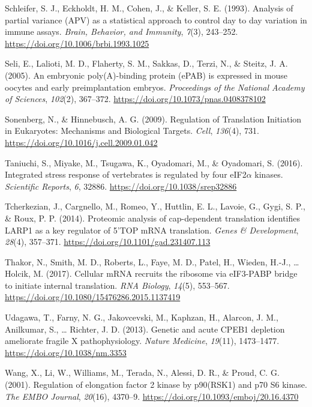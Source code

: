 \documentclass[12pt,openany]{book}
\begin{document}
\hypertarget{ref-Schleifer1993}{}
Schleifer, S. J., Eckholdt, H. M., Cohen, J., \& Keller, S. E. (1993).
Analysis of partial variance (APV) as a statistical approach to control
day to day variation in immune assays. \emph{Brain, Behavior, and
Immunity}, \emph{7}(3), 243--252.
\url{https://doi.org/10.1006/brbi.1993.1025}

\hypertarget{ref-Seli2005}{}
Seli, E., Lalioti, M. D., Flaherty, S. M., Sakkas, D., Terzi, N., \&
Steitz, J. A. (2005). An embryonic poly(A)-binding protein (ePAB) is
expressed in mouse oocytes and early preimplantation embryos.
\emph{Proceedings of the National Academy of Sciences}, \emph{102}(2),
367--372. \url{https://doi.org/10.1073/pnas.0408378102}

\hypertarget{ref-Sonenberg2009}{}
Sonenberg, N., \& Hinnebusch, A. G. (2009). Regulation of Translation
Initiation in Eukaryotes: Mechanisms and Biological Targets.
\emph{Cell}, \emph{136}(4), 731.
\url{https://doi.org/10.1016/j.cell.2009.01.042}

\hypertarget{ref-Taniuchi2016}{}
Taniuchi, S., Miyake, M., Tsugawa, K., Oyadomari, M., \& Oyadomari, S.
(2016). Integrated stress response of vertebrates is regulated by four
eIF2\(\alpha\) kinases. \emph{Scientific Reports}, \emph{6}, 32886.
\url{https://doi.org/10.1038/srep32886}

\hypertarget{ref-Tcherkezian2014}{}
Tcherkezian, J., Cargnello, M., Romeo, Y., Huttlin, E. L., Lavoie, G.,
Gygi, S. P., \& Roux, P. P. (2014). Proteomic analysis of cap-dependent
translation identifies LARP1 as a key regulator of 5'TOP mRNA
translation. \emph{Genes \& Development}, \emph{28}(4), 357--371.
\url{https://doi.org/10.1101/gad.231407.113}

\hypertarget{ref-Thakor2017}{}
Thakor, N., Smith, M. D., Roberts, L., Faye, M. D., Patel, H., Wieden,
H.-J., \ldots{} Holcik, M. (2017). Cellular mRNA recruits the ribosome
via eIF3-PABP bridge to initiate internal translation. \emph{RNA
Biology}, \emph{14}(5), 553--567.
\url{https://doi.org/10.1080/15476286.2015.1137419}

\hypertarget{ref-Udagawa2013}{}
Udagawa, T., Farny, N. G., Jakovcevski, M., Kaphzan, H., Alarcon, J. M.,
Anilkumar, S., \ldots{} Richter, J. D. (2013). Genetic and acute CPEB1
depletion ameliorate fragile X pathophysiology. \emph{Nature Medicine},
\emph{19}(11), 1473--1477. \url{https://doi.org/10.1038/nm.3353}

\hypertarget{ref-Wang2001}{}
Wang, X., Li, W., Williams, M., Terada, N., Alessi, D. R., \& Proud, C.
G. (2001). Regulation of elongation factor 2 kinase by p90(RSK1) and p70
S6 kinase. \emph{The EMBO Journal}, \emph{20}(16), 4370--9.
\url{https://doi.org/10.1093/emboj/20.16.4370}
\end{document}

